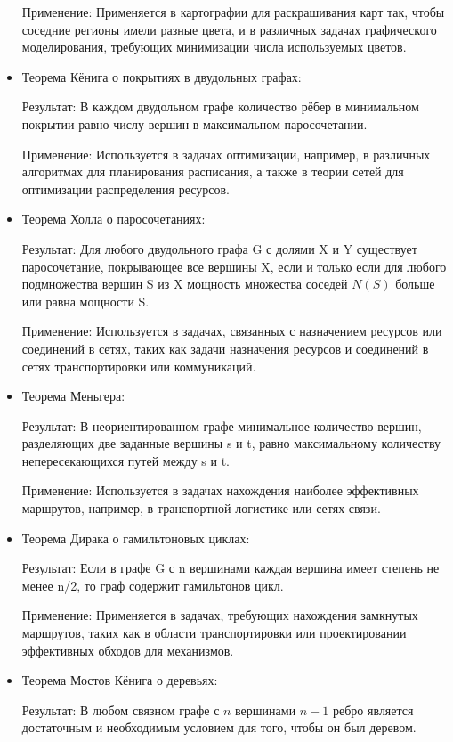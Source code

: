 \begin{itemize}
	Применение: Применяется в картографии для раскрашивания карт так, чтобы соседние регионы имели разные цвета, и в различных задачах графического моделирования, требующих минимизации числа используемых цветов.
	
	\item Теорема Кёнига о покрытиях в двудольных графах:
	
	Результат: В каждом двудольном графе количество рёбер в минимальном покрытии равно числу вершин в максимальном паросочетании.
	
	Применение: Используется в задачах оптимизации, например, в различных алгоритмах для планирования расписания, а также в теории сетей для оптимизации распределения ресурсов.
	
	\item Теорема Холла о паросочетаниях:
	
	Результат: Для любого двудольного графа G с долями X и Y существует паросочетание, покрывающее все вершины X, если и только если для любого подмножества вершин S из X мощность множества соседей $N(S)$ больше или равна мощности S.
	
	Применение: Используется в задачах, связанных с назначением ресурсов или соединений в сетях, таких как задачи назначения ресурсов и соединений в сетях транспортировки или коммуникаций.
	
	\item Теорема Меньгера:
	
	Результат: В неориентированном графе минимальное количество вершин, разделяющих две заданные вершины s и t, равно максимальному количеству непересекающихся путей между s и t.
	
	Применение: Используется в задачах нахождения наиболее эффективных маршрутов, например, в транспортной логистике или сетях связи.
	
	\item Теорема Дирака о гамильтоновых циклах:
	
	Результат: Если в графе G с n вершинами каждая вершина имеет степень не менее n/2, то граф содержит гамильтонов цикл.
	
	Применение: Применяется в задачах, требующих нахождения замкнутых маршрутов, таких как в области транспортировки или проектировании эффективных обходов для механизмов.
	
	\item Теорема Мостов Кёнига о деревьях:
	
	Результат: В любом связном графе с $n$ вершинами $n-1$ ребро является достаточным и необходимым условием для того, чтобы он был деревом.
	

\end{itemize}
